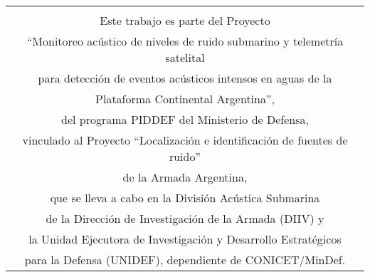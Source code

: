 

\vspace*{170pt}

\begin{center}
	\begin{tabular}[c]{c}
		\hline\hline
		\\
		\Large{Este trabajo es parte del Proyecto}\vspace{2mm}\\
		\Large{``Monitoreo acústico de niveles de ruido submarino y telemetría satelital}\vspace{2mm}\\ 
		\Large{para detección de eventos acústicos intensos en aguas de la }\vspace{2mm}\\ 
		\Large{Plataforma Continental Argentina'',}\vspace{2mm}\\
		\Large{del programa PIDDEF del Ministerio de Defensa,}\vspace{2mm}\\ 
		\Large{vinculado al Proyecto ``Localización e identificación de fuentes de ruido''}\vspace{2mm}\\ 
		\Large{de la Armada Argentina,}\vspace{2mm}\\ 
		\Large{que se lleva a cabo en la División Acústica Submarina}\vspace{2mm}\\ 
		\Large{de la Dirección de Investigación de la Armada (DIIV) y}\vspace{2mm}\\ 
		\Large{la Unidad Ejecutora de Investigación y Desarrollo Estratégicos}\vspace{2mm}\\
		\Large{para la Defensa (UNIDEF), dependiente de CONICET/MinDef.}\vspace{8mm}\\
		\hline\hline
	\end{tabular}
\end{center}

\clearpage